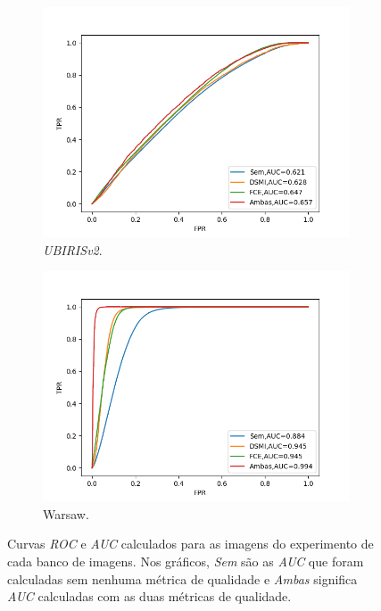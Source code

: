 \begin{figure}[H]
\medskip
\begin{subfigure}{0.5\textwidth}
  \includegraphics[width=\linewidth]{img/Resultados/ubirisv2_inter_distortion_auc.png}
  \caption{\textit{UBIRISv2}.}
\end{subfigure}\hfil %
\begin{subfigure}{0.5\textwidth}
  \includegraphics[width=\linewidth]{img/Resultados/warsaw_inter_distortion_auc.png}
  \caption{{\acrshort{Warsaw}}.}
\end{subfigure}\hfil %
\caption{Curvas \textit{\acrshort{ROC}} e \textit{\acrshort{AUC}} calculados para as imagens do experimento de cada banco de imagens. Nos gráficos, \textit{Sem} são as \textit{\acrshort{AUC}} que foram calculadas sem nenhuma métrica de qualidade e \textit{Ambas} significa \textit{\acrshort{AUC}} calculadas com as duas métricas de qualidade.}
\label{fig:experimentos:roc_comruidos}
\end{figure}


